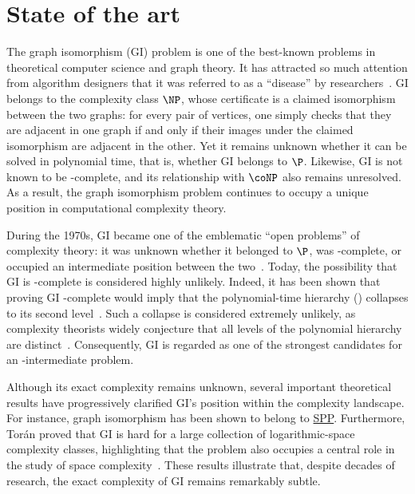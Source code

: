 \chapter{State of the art}

The graph isomorphism (GI) problem is one of the best-known problems in theoretical computer science and graph theory. It has attracted so much attention from algorithm designers that it was referred to as a ``disease'' by researchers~\cite{read1977graph}. GI belongs to the complexity class \hyperref[def:NP]{$\NP$}, whose certificate is a claimed isomorphism between the two graphs: for every pair of vertices, one simply checks that they are adjacent in one graph if and only if their images under the claimed isomorphism are adjacent in the other. Yet it remains unknown whether it can be solved in polynomial time, that is, whether GI belongs to $\P$. Likewise, GI is not known to be \NP-complete, and its relationship with $\coNP$ also remains unresolved. As a result, the graph isomorphism problem continues to occupy a unique position in computational complexity theory.

During the 1970s, GI became one of the emblematic ``open problems'' of complexity theory: it was unknown whether it belonged to $\P$, was \NP-complete, or occupied an intermediate position between the two~\cite{garey2002computers}. Today, the possibility that GI is \NP-complete is considered highly unlikely. Indeed, it has been shown that proving GI \NP-complete would imply that the polynomial-time hierarchy (\PH) collapses to its second level~\cite{goldreich1991proofs, schoning1988graph}. Such a collapse is considered extremely unlikely, as complexity theorists widely conjecture that all levels of the polynomial hierarchy are distinct~\cite{aaronson2016p}. Consequently, GI is regarded as one of the strongest candidates for an \NP-intermediate problem.

Although its exact complexity remains unknown, several important theoretical results have progressively clarified GI's position within the complexity landscape. For instance, graph isomorphism has been shown to belong to \hyperref[def:SPP]{\textsf{SPP}}. Furthermore, Torán proved that GI is hard for a large collection of logarithmic-space complexity classes, highlighting that the problem also occupies a central role in the study of space complexity~\cite{toran2004hardness}. These results illustrate that, despite decades of research, the exact complexity of GI remains remarkably subtle.

